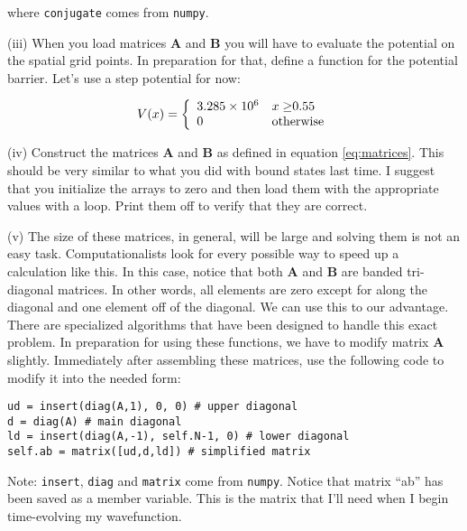 \begin{minipage}{0.9\linewidth}
where \verb!conjugate! comes from \verb!numpy!.

\vspace{0.1in}
(iii)  When you load matrices $\boldsymbol{A}$ and $\boldsymbol{B}$
you will have to evaluate the potential on the spatial grid points.
In preparation for that, define a function for the potential barrier.
Let's use a step potential for now:  


\[ V(x) = \left\{\begin{array}{ll}
      $\num{3.285e6}$ & x\geq $0.55$ \\
      0 & \mathrm{otherwise} 
\end{array}\right. \]

\vspace{0.1in}
(iv) Construct the matrices $\boldsymbol{A}$ and $\boldsymbol{B}$ as
defined in  equation \eqref{eq:matrices}.  This should be very similar
to what you did with bound states last time.  I suggest that you
initialize the arrays to zero and then load them with the appropriate
values with a loop. Print them off to verify that they are correct.

\vspace{0.1in}

(v) The size of these matrices, in general, will be large and solving
them is not an easy task.  Computationalists look for every possible
way to speed up a calculation like this.  In this case, notice that
both $\boldsymbol{A}$ and $\boldsymbol{B}$ are banded tri-diagonal
matrices.  In other words, all elements are zero except for along the
diagonal and one element off of the diagonal.  We can use this to our
advantage.  There are specialized algorithms that have been designed
to handle this exact problem.  In preparation for using these
functions, we have to modify matrix $\boldsymbol{A}$
slightly. Immediately after assembling these matrices, use the
following code to modify it into the needed form:

\begin{verbatim}
ud = insert(diag(A,1), 0, 0) # upper diagonal
d = diag(A) # main diagonal
ld = insert(diag(A,-1), self.N-1, 0) # lower diagonal
self.ab = matrix([ud,d,ld]) # simplified matrix
\end{verbatim}
Note: \verb!insert!, \verb!diag! and \verb!matrix! come from \verb!numpy!.
Notice that matrix ``ab'' has been saved as a member variable. This is
the matrix that I'll need when I begin time-evolving my wavefunction.
\end{minipage}

